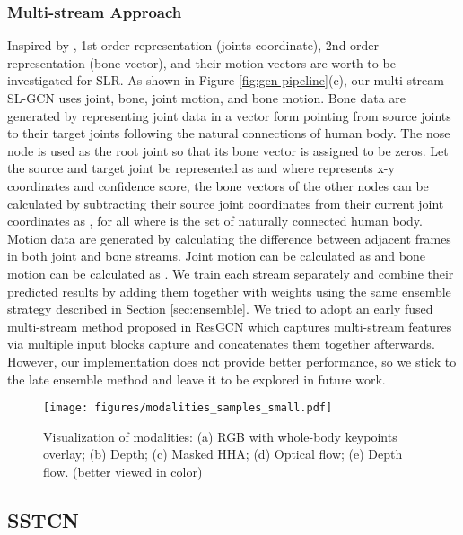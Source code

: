 \documentclass[final]{cvpr}
\begin{document}
\subsubsection{Multi-stream Approach}
\label{sec:multi-stream}
Inspired by \cite{shi2020skeleton}, 1st-order representation (joints coordinate), 2nd-order representation (bone vector), and their motion vectors are worth to be investigated for SLR. As shown in Figure \ref{fig:gcn-pipeline}(c), our multi-stream SL-GCN uses joint, bone, joint motion, and bone motion. Bone data are generated by representing joint data in a vector form pointing from source joints to their target joints following the natural connections of human body. The nose node is used as the root joint so that its bone vector is assigned to be zeros. Let the source and target joint be represented as  and  where  represents x-y coordinates and confidence score, the bone vectors of the other nodes can be calculated by subtracting their source joint coordinates from their current joint coordinates as , for all  where  is the set of naturally connected human body. Motion data are generated by calculating the difference between adjacent frames in both joint and bone streams. Joint motion can be calculated as  and bone motion can be calculated as . We train each stream separately and combine their predicted results by adding them together with weights using the same ensemble strategy described in Section \ref{sec:ensemble}. We tried to adopt an early fused multi-stream method proposed in ResGCN \cite{song2020stronger} which captures multi-stream features via multiple input blocks capture and concatenates them together afterwards. However, our implementation does not provide better performance, so we stick to the late ensemble method and leave it to be explored in future work.

\begin{figure}
  \centering
  \texttt{[image: figures/modalities\_samples\_small.pdf]}
  \caption{Visualization of modalities: (a) RGB with whole-body keypoints overlay; (b) Depth; (c) Masked HHA; (d) Optical flow; (e) Depth flow. (better viewed in color)}
\label{fig:modalities}
\end{figure}

\subsection{SSTCN}
\label{sec:SSTCN}
\end{document}
